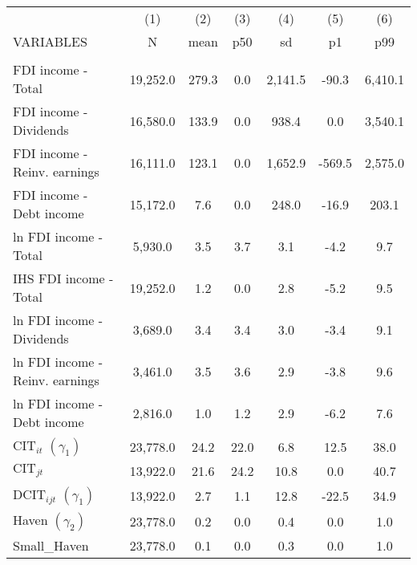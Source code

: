 \begin{center}
\begin{tabular}{lcccccc} \hline
 & (1) & (2) & (3) & (4) & (5) & (6) \\
VARIABLES & N & mean & p50 & sd & p1 & p99 \\ \hline
\vspace{4pt} & \begin{footnotesize}\end{footnotesize} & \begin{footnotesize}\end{footnotesize} & \begin{footnotesize}\end{footnotesize} & \begin{footnotesize}\end{footnotesize} & \begin{footnotesize}\end{footnotesize} & \begin{footnotesize}\end{footnotesize} \\
FDI income - Total & 19,252.0 & 279.3 & 0.0 & 2,141.5 & -90.3 & 6,410.1 \\
FDI income - Dividends & 16,580.0 & 133.9 & 0.0 & 938.4 & 0.0 & 3,540.1 \\
FDI income - Reinv. earnings & 16,111.0 & 123.1 & 0.0 & 1,652.9 & -569.5 & 2,575.0 \\
FDI income - Debt income & 15,172.0 & 7.6 & 0.0 & 248.0 & -16.9 & 203.1 \\
ln FDI income - Total & 5,930.0 & 3.5 & 3.7 & 3.1 & -4.2 & 9.7 \\
IHS FDI income - Total & 19,252.0 & 1.2 & 0.0 & 2.8 & -5.2 & 9.5 \\
ln FDI income - Dividends & 3,689.0 & 3.4 & 3.4 & 3.0 & -3.4 & 9.1 \\
ln FDI income - Reinv. earnings & 3,461.0 & 3.5 & 3.6 & 2.9 & -3.8 & 9.6 \\
ln FDI income - Debt income & 2,816.0 & 1.0 & 1.2 & 2.9 & -6.2 & 7.6 \\
$ \text{CIT}_{it}$ $(\gamma_1)$ & 23,778.0 & 24.2 & 22.0 & 6.8 & 12.5 & 38.0 \\
$ \text{CIT}_{jt}$ & 13,922.0 & 21.6 & 24.2 & 10.8 & 0.0 & 40.7 \\
$ \text{DCIT}_{ijt}$ $(\gamma_1)$ & 13,922.0 & 2.7 & 1.1 & 12.8 & -22.5 & 34.9 \\
Haven $(\gamma_2)$ & 23,778.0 & 0.2 & 0.0 & 0.4 & 0.0 & 1.0 \\
Small\_Haven & 23,778.0 & 0.1 & 0.0 & 0.3 & 0.0 & 1.0 \\

\end{tabular}
\end{center}
